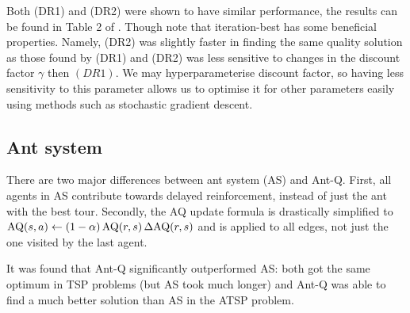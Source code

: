 Both (DR1) and (DR2) were shown to have similar performance, the results can be found in Table 2 of \cite{gambardella1995ant}. Though \textcite{gambardella1995ant} note that iteration-best has some beneficial properties. Namely, (DR2) was slightly faster in finding the same quality solution as those found by (DR1) and (DR2) was less sensitive to changes in the discount factor $\gamma$ then $(DR1)$. We may hyperparameterise discount factor, so having less sensitivity to this parameter allows us to optimise it for other parameters easily using methods such as stochastic gradient descent.

\subsection{Ant system}

There are two major differences between ant system (AS) and Ant-Q. First, all agents in AS contribute towards delayed reinforcement, instead of just the ant with the best tour. Secondly, the AQ update formula is drastically simplified to $\operatorname{AQ}(s,a) \gets (1 - \alpha) \operatorname{AQ}(r,s) \operatorname{\Delta AQ}(r,s)$ and is applied to all edges, not just the one visited by the last agent. 

It was found that Ant-Q significantly outperformed AS: both got the same optimum in TSP problems (but AS took much longer) and Ant-Q was able to find a much better solution than AS in the ATSP problem.